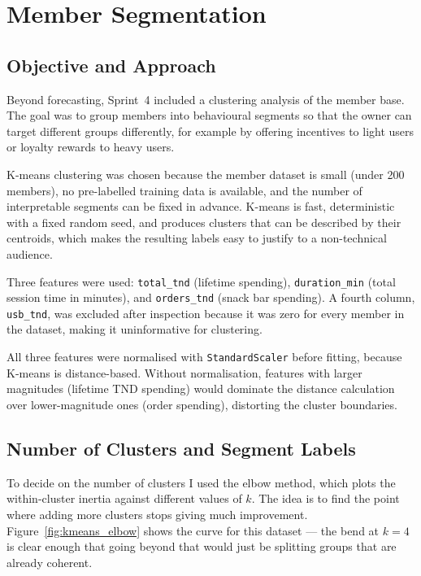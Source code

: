 \documentclass[12pt, a4paper]{report}
\begin{document}
\section{Member Segmentation}

\subsection{Objective and Approach}

Beyond forecasting, Sprint~4 included a clustering analysis of the member base.
The goal was to group members into behavioural segments so that the owner can
target different groups differently, for example by offering incentives to light
users or loyalty rewards to heavy users.

K-means clustering was chosen because the member dataset is small (under 200
members), no pre-labelled training data is available, and the number of
interpretable segments can be fixed in advance. K-means is fast, deterministic
with a fixed random seed, and produces clusters that can be described by their
centroids, which makes the resulting labels easy to justify to a non-technical
audience.

Three features were used: \texttt{total\_tnd} (lifetime spending),
\texttt{duration\_min} (total session time in minutes), and \texttt{orders\_tnd}
(snack bar spending). A fourth column, \texttt{usb\_tnd}, was excluded after
inspection because it was zero for every member in the dataset, making it
uninformative for clustering.

All three features were normalised with \texttt{StandardScaler} before fitting,
because K-means is distance-based. Without normalisation, features with larger
magnitudes (lifetime TND spending) would dominate the distance calculation over
lower-magnitude ones (order spending), distorting the cluster boundaries.

\subsection{Number of Clusters and Segment Labels}

To decide on the number of clusters I used the elbow method, which plots the
within-cluster inertia against different values of $k$. The idea is to find the
point where adding more clusters stops giving much improvement.
Figure~\ref{fig:kmeans_elbow} shows the curve for this dataset --- the bend at
$k = 4$ is clear enough that going beyond that would just be splitting groups
that are already coherent.
\end{document}
